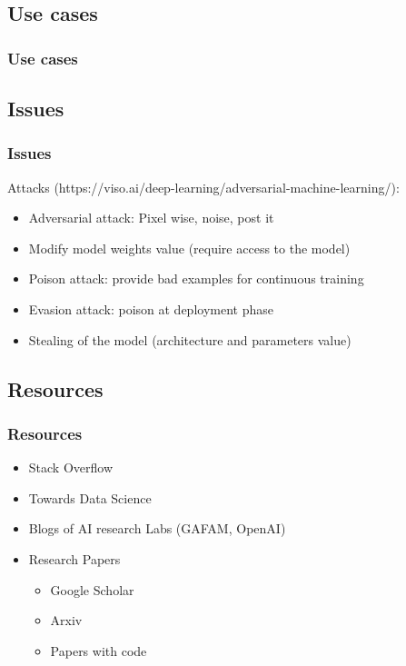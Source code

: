 \subsection{Use cases}
\begin{frame}\frametitle{Use cases}

\end{frame}



\subsection{Issues}
\begin{frame}\frametitle{Issues}
   \item Attacks (https://viso.ai/deep-learning/adversarial-machine-learning/):
   \begin{itemize}
      \item Adversarial attack: Pixel wise, noise, post it
      \item Modify model weights value (require access to the model)
      \item Poison attack: provide bad examples for continuous training
      \item Evasion attack: poison at deployment phase
      \item Stealing of the model (architecture and parameters value)
   \end{itemize}
\end{frame}



\subsection{Resources}
\begin{frame}\frametitle{Resources}

   \begin{itemize}
      \item Stack Overflow
      \item Towards Data Science
      \item Blogs of AI research Labs (GAFAM, OpenAI)
      \item Research Papers
      \begin{itemize}
         \item Google Scholar
         \item Arxiv
         \item Papers with code
      \end{itemize}
   \end{itemize}

\end{frame}



